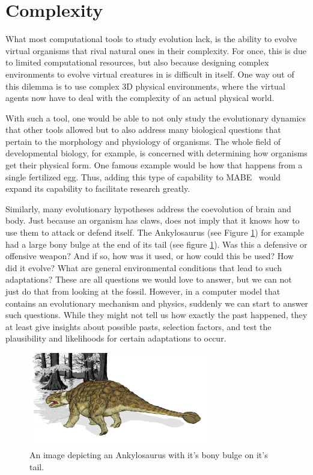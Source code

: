 \documentclass[12pt,oneside,listof=totoc,paper=a4,headings=small]{scrbook}
\begin{document}
\newpage
\section{Complexity}
What most computational tools to study evolution lack, is the ability to evolve virtual organisms that rival natural ones in their complexity. For once, this is due to limited computational resources, but also because designing complex environments to evolve virtual creatures in is difficult in itself. One way out of this dilemma is to use complex 3D physical environments, where the virtual agents now have to deal with the complexity of an actual physical world. 

With such a tool, one would be able to not only study the evolutionary dynamics that other tools allowed but to also address many biological questions that pertain to the morphology and physiology of organisms. The whole field of developmental biology, for example, is concerned with determining how organisms get their physical form. One famous example would be how that happens from a single fertilized egg. Thus, adding this type of capability to MABE~\cite{MABE2016,bohm2017mabe} would expand its capability to facilitate research greatly.

Similarly, many evolutionary hypotheses address the coevolution of brain and body. Just because an organism has claws, does not imply that it knows how to use them to attack or defend itself. The Ankylosaurus (see Figure \ref{fig:Ankylosaurus_dinosaur}) for example had a large bony bulge at the end of its tail (see figure \ref{fig:Ankylosaurus_dinosaur}). Was this a defensive or offensive weapon? And if so, how was it used, or how could this be used? How did it evolve? What are general environmental conditions that lead to such adaptations? These are all questions we would love to answer, but we can not just do that from looking at the fossil. However, in a computer model that contains an evolutionary mechanism and physics, suddenly we can start to answer such questions. While they might not tell us how exactly the past happened, they at least give insights about possible pasts, selection factors, and test the plausibility and likelihoods for certain adaptations to occur. 



\begin{figure}[h!]
\centering
\includegraphics[width=0.7\textwidth,height=0.7\textheight,keepaspectratio]{images/Ankylosaurus_dinosaur.png}
\caption{An image depicting an Ankylosaurus with it's bony bulge on it's tail.~\cite{dino}}
\label{fig:Ankylosaurus_dinosaur}
\end{figure}
\end{document}
